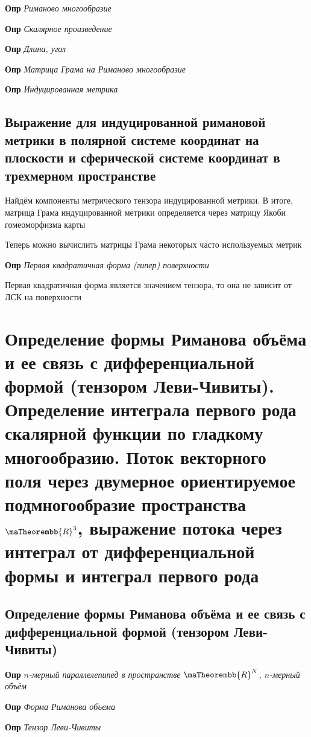 \documentclass[a4paper, 14pt]{article}
\begin{document}
    \textbf{Опр} \textit{Риманово многообразие}
    
    \textbf{Опр} \textit{Скалярное произведение}
    
    \textbf{Опр} \textit{Длина, угол}
    
    \textbf{Опр} \textit{Матрица Грама на Риманово многообразие}
    
    \textbf{Опр} \textit{Индуцированная метрика}
    
    \subsection{Выражение для индуцированной римановой метрики в полярной системе координат на плоскости и
    сферической системе координат в трехмерном пространстве}
    
    Найдём компоненты метрического тензора индуцированной метрики.
    В итоге, матрица Грама индуцированной метрики определяется через матрицу Якоби гомеоморфизма карты
    
    Теперь можно вычислить матрицы Грама некоторых часто используемых метрик
    
    \textbf{Опр} \textit{Первая квадратичная форма (гипер) поверхности}
    
    Первая квадратичная форма является значением тензора, то она не зависит от ЛСК на поверхности
    
    \section{Определение формы Риманова объёма и ее связь с дифференциальной формой (тензором Леви-Чивиты).
    Определение интеграла первого рода скалярной функции по гладкому многообразию.
    Поток векторного поля через двумерное ориентируемое подмногообразие пространства $\maTheorembb{R}^3$, выражение
    потока через интеграл от дифференциальной формы и интеграл первого рода}
    
    \subsection{Определение формы Риманова объёма и ее связь с дифференциальной формой (тензором Леви-Чивиты)}
    
    \textbf{Опр} \textit{$n$-мерный параллелепипед в пространстве $\maTheorembb{R}^N$, $n$-мерный объём}
    
    \textbf{Опр} \textit{Форма Риманова объема}
    
    \textbf{Опр} \textit{Тензор Леви-Чивиты}
    
\end{document}
